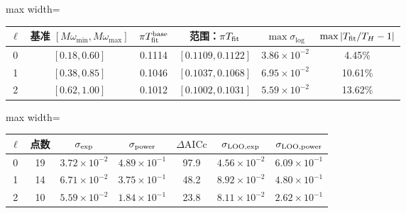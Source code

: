 \documentclass[UTF8,fontset=fandol,11pt,a4paper]{ctexart}
\begin{document}
\par\addvspace{12pt}\noindent\begin{minipage}{\linewidth}
\centering\fontsize{9.5}{12}\selectfont\setlength{\tabcolsep}{3pt}\renewcommand{\arraystretch}{1.18}
\label{audit:tab:tail-window}
\begin{adjustbox}{max width=\linewidth}
\begin{tabular}{c c c c c c}
\toprule
$\ell$ & 基准 $[M\omega_{\min},M\omega_{\max}]$
& $\pi T_{\rm fit}^{\rm base}$ & 范围：$\pi T_{\rm fit}$
& $\max\sigma_{\log}$ & $\max|T_{\rm fit}/T_H-1|$\\
\midrule
0 & $[0.18,0.60]$ & 0.1114 & $[0.1109,0.1122]$ & $3.86\times10^{-2}$ & 4.45\%\\
1 & $[0.38,0.85]$ & 0.1046 & $[0.1037,0.1068]$ & $6.95\times10^{-2}$ & 10.61\%\\
2 & $[0.62,1.00]$ & 0.1012 & $[0.1002,0.1031]$ & $5.59\times10^{-2}$ & 13.62\%\\
\bottomrule\end{tabular}\end{adjustbox}
\end{minipage}\par\addvspace{9pt}




\par\addvspace{12pt}\noindent\begin{minipage}{\linewidth}
\centering\fontsize{9.5}{12}\selectfont\setlength{\tabcolsep}{3pt}\renewcommand{\arraystretch}{1.18}
\label{audit:tab:tail-models}
\begin{adjustbox}{max width=\linewidth}
\begin{tabular}{c c c c c c c}
\toprule
$\ell$ & 点数 & $\sigma_{\rm exp}$ & $\sigma_{\rm power}$
& $\Delta\mathrm{AICc}$ & $\sigma_{\rm LOO,exp}$ & $\sigma_{\rm LOO,power}$\\
\midrule
0 & 19 & $3.72\times10^{-2}$ & $4.89\times10^{-1}$ & 97.9 & $4.56\times10^{-2}$ & $6.09\times10^{-1}$\\
1 & 14 & $6.71\times10^{-2}$ & $3.75\times10^{-1}$ & 48.2 & $8.92\times10^{-2}$ & $4.80\times10^{-1}$\\
2 & 10 & $5.59\times10^{-2}$ & $1.84\times10^{-1}$ & 23.8 & $8.11\times10^{-2}$ & $2.62\times10^{-1}$\\
\bottomrule\end{tabular}\end{adjustbox}
\end{minipage}\par\addvspace{9pt}
\end{document}
